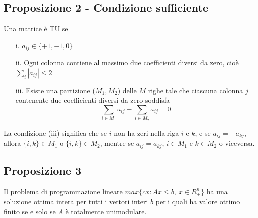 \documentclass[12pt,a4paper]{article}
\begin{document}
\subsection{Proposizione 2 - Condizione sufficiente}
Una matrice è TU se \begin{itemize}
\item[i.] $a_{ij}\in \{+1,-1,0\}$
\item[ii.] Ogni colonna contiene al massimo due coefficienti diversi da zero, cioè $\sum_i |a_{ij}| \leq 2$
\item[iii.] Esiste una partizione ($M_1,M_2$) delle $M$ righe tale che ciascuna colonna $j$ contenente due coefficienti diversi da zero soddisfa $$\sum_{i \in M_1}a_{ij} - \sum_{i\in M_2}a_{ij}=0$$
\end{itemize}
La condizione (iii) significa che se $i$ non ha zeri nella riga $i$ e $k$, e se $a_{ij} = -a_{kj}$, allora $\{i, k\} \in M_1$ o $\{i, k\} \in M_2$, mentre se $a_{ij} = a_{kj} ,\ i \in M_1$ e $k \in M_2$ o viceversa.

\subsection{Proposizione 3}
Il problema di programmazione lineare $max\{cx : Ax \leq b,\ x \in R^n_+\}$ ha una soluzione ottima intera per tutti i vettori interi $b$ per i quali ha valore ottimo finito se e solo se $A$ è totalmente unimodulare.
\end{document}

